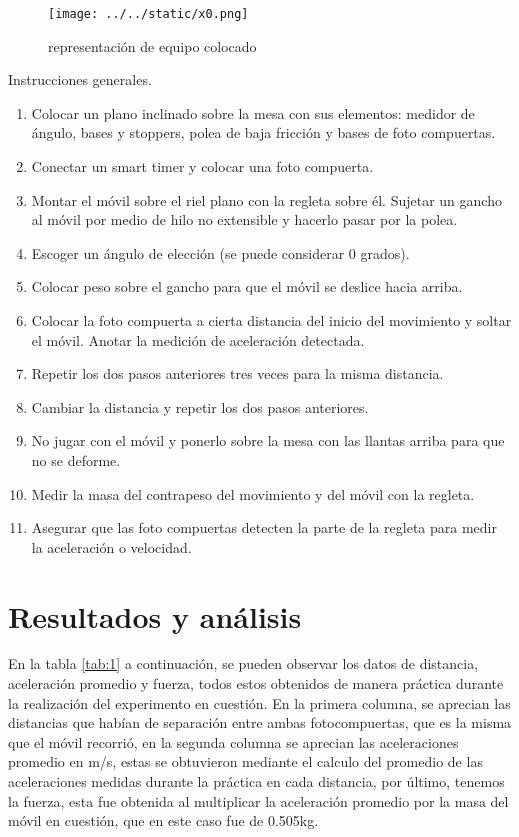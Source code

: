\documentclass{article}
\begin{document}
\begin{multicols}{2}
\begin{figure}[H]
	\centering	
	\texttt{[image: ../../static/x0.png]}
	\caption{representación de equipo colocado}
	\label{fig:1}
\end{figure}

Instrucciones generales.

\begin{enumerate}
\item Colocar un plano inclinado sobre la mesa con sus elementos: medidor de ángulo, bases y stoppers, polea de baja fricción y bases de foto compuertas.
\item Conectar un smart timer y colocar una foto compuerta.
\item Montar el móvil sobre el riel plano con la regleta sobre él. Sujetar un gancho al móvil por medio de hilo no extensible y hacerlo pasar por la polea.
\item Escoger un ángulo de elección (se puede considerar 0 grados).
\item Colocar peso sobre el gancho para que el móvil se deslice hacia arriba.
\item Colocar la foto compuerta a cierta distancia del inicio del movimiento y soltar el móvil. Anotar la medición de aceleración detectada.
\item Repetir los dos pasos anteriores tres veces para la misma distancia.
\item Cambiar la distancia y repetir los dos pasos anteriores.
\item No jugar con el móvil y ponerlo sobre la mesa con las llantas arriba para que no se deforme.
\item Medir la masa del contrapeso del movimiento y del móvil con la regleta.
\item Asegurar que las foto compuertas detecten la parte de la regleta para medir la aceleración o velocidad.
\end{enumerate}


\end{multicols}
\section{Resultados y análisis}\label{Resultados}			%
En la tabla \ref{tab:1} a continuación, se pueden observar los datos de distancia, aceleración promedio y fuerza, todos estos obtenidos de manera práctica durante la realización del experimento en cuestión. En la primera columna, se aprecian las distancias que habían de separación entre ambas fotocompuertas, que es la misma que el móvil recorrió, en la segunda columna se aprecian las aceleraciones promedio en m/s, estas se obtuvieron mediante el calculo del promedio de las aceleraciones medidas durante la práctica en cada distancia, por último, tenemos la fuerza, esta fue obtenida al multiplicar la aceleración promedio por la masa del móvil en cuestión, que en este caso fue de 0.505kg. 
\end{document}
